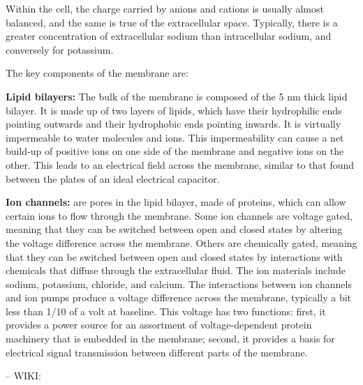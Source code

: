 Within the cell, the charge carried by anions and cations is usually almost balanced, and the same is true of the extracellular space. Typically, there is a greater concentration of extracellular sodium than intracellular sodium, and conversely for potassium. 

The key components of the membrane are: 

\textbf{Lipid bilayers:} The bulk of the membrane is composed of the 5 nm thick lipid bilayer. It is made up of two layers of lipids, which have their hydrophilic ends pointing outwards and their hydrophobic ends pointing inwards. It is virtually impermeable to water molecules and ions. This impermeability can cause a net build-up of positive ions on one side of the membrane and negative ions on the other. This leads to an electrical field across the membrane, similar to that found between the plates of an ideal electrical capacitor. 

\textbf{Ion channels:} are pores in the lipid bilayer, made of proteins, which can allow certain ions to flow through the membrane. Some ion channels are voltage gated, meaning that they can be switched between open and closed states by altering the voltage difference across the membrane. Others are chemically gated, meaning that they can be switched between open and closed states by interactions with chemicals that diffuse through the extracellular fluid. The ion materials include sodium, potassium, chloride, and calcium. The interactions between ion channels and ion pumps produce a voltage difference across the membrane, typically a bit less than 1/10 of a volt at baseline. This voltage has two functions: first, it provides a power source for an assortment of voltage-dependent protein machinery that is embedded in the membrane; second, it provides a basis for electrical signal transmission between different parts of the membrane.

--
WIKI:

